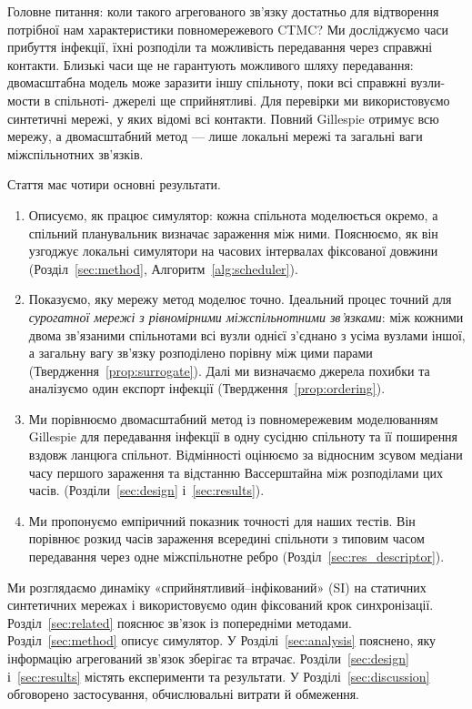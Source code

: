 \documentclass[a4paper,fleqn]{cas-sc}
\begin{document}
Головне питання: коли такого агрегованого зв'язку достатньо для відтворення потрібної нам характеристики повномережевого CTMC? Ми досліджуємо часи прибуття інфекції, їхні розподіли та можливість передавання через справжні контакти. Близькі часи ще не гарантують можливого шляху
передавання: двомасштабна модель може заразити іншу спільноту, поки всі справжні вузли-мости в спільноті-
джерелі ще сприйнятливі. Для перевірки ми використовуємо синтетичні мережі, у яких відомі всі контакти.
Повний Gillespie отримує всю мережу, а двомасштабний метод — лише локальні мережі та загальні ваги
міжспільнотних зв’язків.

Стаття має чотири основні результати.
\begin{enumerate}
\item Описуємо, як працює симулятор: кожна спільнота моделюється окремо, а спільний планувальник визначає
зараження між ними. Пояснюємо, як він узгоджує локальні симулятори на часових інтервалах фіксованої довжини (Розділ~\ref{sec:method}, Алгоритм~\ref{alg:scheduler}).
\item Показуємо, яку мережу метод моделює точно. Ідеальний процес точний для \emph{сурогатної мережі з рівномірними міжспільнотними зв’язками}: між кожними двома зв’язаними спільнотами всі вузли однієї з’єднано з усіма вузлами іншої, а загальну вагу зв’язку розподілено порівну між цими парами (Твердження~\ref{prop:surrogate}). Далі ми визначаємо джерела похибки та аналізуємо один експорт інфекції (Твердження~\ref{prop:ordering}).
\item Ми порівнюємо двомасштабний метод із повномережевим моделюванням Gillespie для передавання інфекції в одну сусідню спільноту та її поширення вздовж ланцюга спільнот. Відмінності оцінюємо за відносним зсувом медіани часу першого зараження та відстанню Вассерштайна між розподілами цих часів.  (Розділи~\ref{sec:design} і~\ref*{sec:results}).
\item Ми пропонуємо емпіричний показник точності для наших тестів. Він порівнює розкид часів зараження всередині спільноти з типовим часом передавання через одне міжспільнотне ребро (Розділ~\ref*{sec:res_descriptor}).
\end{enumerate}

Ми розглядаємо динаміку «сприйнятливий--інфікований» (SI) на статичних синтетичних мережах і використовуємо один фіксований крок синхронізації. Розділ~\ref{sec:related} пояснює зв'язок із попередніми методами. Розділ~\ref{sec:method} описує симулятор. У Розділі~\ref{sec:analysis} пояснено, яку інформацію агрегований зв'язок зберігає та втрачає. Розділи~\ref{sec:design} і~\ref*{sec:results} містять експерименти та результати. У Розділі~\ref*{sec:discussion} обговорено застосування, обчислювальні витрати й обмеження.
\end{document}
